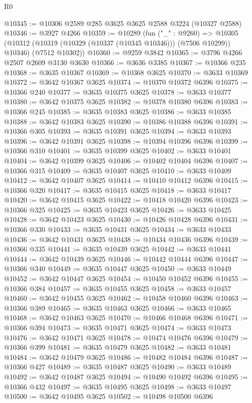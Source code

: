 \begin{lexlean}{R0}
\begin{coremodule}
@10345 := @10306 @2589 @285 @3625 @3625 @2588 @3224 (@10327 @2588)
@10346 := @3927 @4266
@10359 := @10289
    (fun ("_" : @9260) =>
    @10305 (@10312 (@10319 (@10329 (@10337 (@10345 @10346))) (@7506 @10299)) @10346) (@7512 @10302))
@10360 := @9259 @3842
@10365 := @3796 @4266 @2507 @2609 @3130 @3630
@10366 := @3636 @3385
@10367 := @10366 @235
@10368 := @3635 @10367
@10369 := @10368 @3625
@10370 := @3633 @10369
@10372 := @3642 @10367 @3625
@10374 := @10370 @10372 @6396
@10375 := @10366 @240
@10377 := @3635 @10375 @3625
@10378 := @3633 @10377
@10380 := @3642 @10375 @3625
@10382 := @10378 @10380 @6396
@10383 := @10366 @245
@10385 := @3635 @10383 @3625
@10386 := @3633 @10385
@10388 := @3642 @10383 @3625
@10390 := @10386 @10388 @6396
@10391 := @10366 @305
@10393 := @3635 @10391 @3625
@10394 := @3633 @10393
@10396 := @3642 @10391 @3625
@10398 := @10394 @10396 @6396
@10399 := @10366 @310
@10401 := @3635 @10399 @3625
@10402 := @3633 @10401
@10404 := @3642 @10399 @3625
@10406 := @10402 @10404 @6396
@10407 := @10366 @315
@10409 := @3635 @10407 @3625
@10410 := @3633 @10409
@10412 := @3642 @10407 @3625
@10414 := @10410 @10412 @6396
@10415 := @10366 @320
@10417 := @3635 @10415 @3625
@10418 := @3633 @10417
@10420 := @3642 @10415 @3625
@10422 := @10418 @10420 @6396
@10423 := @10366 @325
@10425 := @3635 @10423 @3625
@10426 := @3633 @10425
@10428 := @3642 @10423 @3625
@10430 := @10426 @10428 @6396
@10431 := @10366 @330
@10433 := @3635 @10431 @3625
@10434 := @3633 @10433
@10436 := @3642 @10431 @3625
@10438 := @10434 @10436 @6396
@10439 := @10366 @335
@10441 := @3635 @10439 @3625
@10442 := @3633 @10441
@10444 := @3642 @10439 @3625
@10446 := @10442 @10444 @6396
@10447 := @10366 @340
@10449 := @3635 @10447 @3625
@10450 := @3633 @10449
@10452 := @3642 @10447 @3625
@10454 := @10450 @10452 @6396
@10455 := @10366 @384
@10457 := @3635 @10455 @3625
@10458 := @3633 @10457
@10460 := @3642 @10455 @3625
@10462 := @10458 @10460 @6396
@10463 := @10366 @389
@10465 := @3635 @10463 @3625
@10466 := @3633 @10465
@10468 := @3642 @10463 @3625
@10470 := @10466 @10468 @6396
@10471 := @10366 @394
@10473 := @3635 @10471 @3625
@10474 := @3633 @10473
@10476 := @3642 @10471 @3625
@10478 := @10474 @10476 @6396
@10479 := @10366 @399
@10481 := @3635 @10479 @3625
@10482 := @3633 @10481
@10484 := @3642 @10479 @3625
@10486 := @10482 @10484 @6396
@10487 := @10366 @427
@10489 := @3635 @10487 @3625
@10490 := @3633 @10489
@10492 := @3642 @10487 @3625
@10494 := @10490 @10492 @6396
@10495 := @10366 @432
@10497 := @3635 @10495 @3625
@10498 := @3633 @10497
@10500 := @3642 @10495 @3625
@10502 := @10498 @10500 @6396

\end{coremodule}
\end{lexlean}
